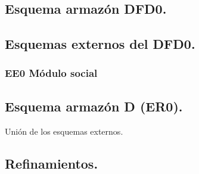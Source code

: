 \documentclass[12pt,a4paper]{article}
\begin{document}
\subsection{Esquema armazón DFD0.}
  \begin{center}
  \end{center}
\subsection{Esquemas externos del DFD0.}
	\subsubsection{EE0 Módulo social}
  \begin{center}
  \end{center}
\subsection{Esquema armazón D (ER0).}
	Unión de los esquemas externos.
\subsection{Refinamientos.}
\end{document}

